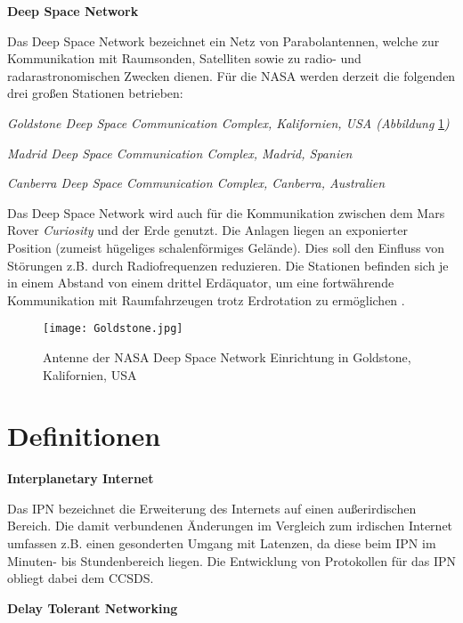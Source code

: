 \textbf{Deep Space Network}

Das Deep Space Network bezeichnet ein Netz von Parabolantennen, welche zur
Kommunikation mit Raumsonden, Satelliten sowie zu radio-
und radarastronomischen Zwecken dienen. F{\"u}r die NASA werden derzeit die
folgenden drei gro{\ss}en Stationen betrieben:

\begin{compactenum}[a)]
\item \textit{Goldstone Deep Space Communication Complex, Kalifornien, USA
(Abbildung} \ref{fig:Goldstone}\textit{)}
\item \textit{Madrid Deep Space Communication Complex, Madrid, Spanien}
\item \textit{Canberra Deep Space Communication Complex, Canberra, Australien}
\end{compactenum}

Das Deep Space Network wird auch f{\"u}r die Kommunikation zwischen dem Mars
Rover \textit{Curiosity} und der Erde genutzt. Die Anlagen liegen an exponierter Position
(zumeist h{\"u}geliges schalenf{\"o}rmiges Gel{\"a}nde). Dies soll den
Einfluss von St{\"o}rungen z.B. durch Radiofrequenzen reduzieren. Die Stationen
befinden sich je in einem Abstand von einem drittel Erd{\"a}quator, um eine
fortw{\"a}hrende Kommunikation mit Raumfahrzeugen trotz Erdrotation zu
erm{\"o}glichen \cite{web6}.

\begin{figure}[H]
\centering
\texttt{[image: Goldstone.jpg]}
\caption[Antenne der NASA Deep Space Network Einrichtung in Goldstone, Kalifornien, USA]
{Antenne der NASA Deep Space Network Einrichtung in Goldstone, Kalifornien, USA \cite{imgGoldstone}}
\label{fig:Goldstone}
\end{figure}

\section{Definitionen}

\textbf{Interplanetary Internet}

Das \gls{IPN} bezeichnet die Erweiterung des Internets
auf einen au{\ss}erirdischen Bereich. Die damit verbundenen {\"A}nderungen im
Vergleich zum irdischen Internet umfassen z.B. einen gesonderten Umgang mit
Latenzen, da diese beim \gls{IPN} im Minuten- bis Stundenbereich liegen. Die
Entwicklung von Protokollen f{\"u}r das \gls{IPN} obliegt dabei dem \gls{CCSDS}.

\textbf{Delay Tolerant Networking}

